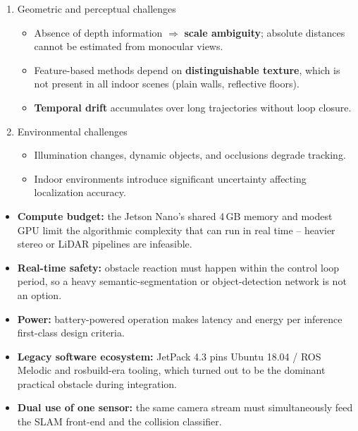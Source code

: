 {
	\begin{enumerate} 
		\item Geometric and perceptual challenges
	\begin{itemize}
		\item Absence of depth information $\Rightarrow$ \textbf{scale ambiguity}; absolute distances cannot be estimated from monocular views.
		\item Feature-based methods depend on \textbf{distinguishable texture}, which is not present in all indoor scenes (plain walls, reflective floors).
		\item \textbf{Temporal drift} accumulates over long trajectories without loop closure.
	\end{itemize}
		\vspace{0.4em}
	\item Environmental challenges
	\begin{itemize}
		\item Illumination changes, dynamic objects, and occlusions degrade tracking.
		\item Indoor environments introduce significant uncertainty affecting localization accuracy.
	\end{itemize}
\end{enumerate}
}
{
	\begin{itemize}
		\item \textbf{Compute budget:} the Jetson Nano's shared 4\,GB memory and modest GPU limit the algorithmic complexity that can run in real time -- heavier stereo or LiDAR pipelines are infeasible.
		\item \textbf{Real-time safety:} obstacle reaction must happen within the control loop period, so a heavy semantic-segmentation or object-detection network is not an option.
		\item \textbf{Power:} battery-powered operation makes latency and energy per inference first-class design criteria.
		\item \textbf{Legacy software ecosystem:} JetPack 4.3 pins Ubuntu 18.04 / ROS Melodic and rosbuild-era tooling, which turned out to be the dominant practical obstacle during integration.
		\item \textbf{Dual use of one sensor:} the same camera stream must simultaneously feed the SLAM front-end and the collision classifier.
	\end{itemize}
}

